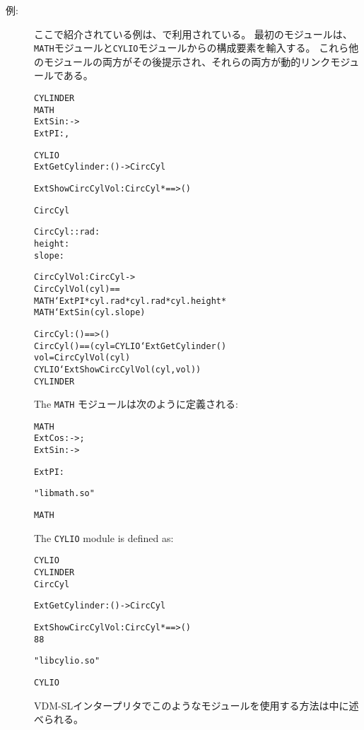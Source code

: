 \documentclass[\pformat,12pt]{jarticle}
\begin{document}
\begin{description}
\item[例:] ここで紹介されている例は、\cite{DLMan-SCSK}で利用されている。
最初のモジュールは、{\tt MATH}モジュールと{\tt CYLIO}モジュールからの構成要素を輸入する。 
これら他のモジュールの両方がその後提示され、それらの両方が動的リンクモジュールである。
\begin{alltt}
 CYLINDER
     MATH
          ExtSin :  -> 
          ExtPI : ,

     CYLIO
          ExtGetCylinder : () -> CircCyl
   
          ExtShowCircCylVol : CircCyl *  ==> ()

         CircCyl  

        CircCyl :: rad    : 
                   height : 
                   slope  : 
	
        CircCylVol : CircCyl -> 
        CircCylVol(cyl) ==
          MATH`ExtPI * cyl.rad * cyl.rad * cyl.height * 
          MATH`ExtSin(cyl.slope)

        CircCyl : () ==> ()
        CircCyl() == (  cyl = CYLIO`ExtGetCylinder()  
                          vol = CircCylVol(cyl) 
                            CYLIO`ExtShowCircCylVol(cyl, vol))
 CYLINDER
\end{alltt}

The {\tt MATH} モジュールは次のように定義される:

\begin{alltt}
 MATH
      ExtCos :  -> ;
      ExtSin :  ->   
      
      ExtPI : 
  
      "libmath.so" 

 MATH
\end{alltt}

The {\tt CYLIO} module is defined as:

\begin{alltt}
 CYLIO
     CYLINDER
        CircCyl

       ExtGetCylinder : () -> CircCyl
   
       ExtShowCircCylVol : CircCyl *  ==> ()
  88 

      "libcylio.so"

 CYLIO
\end{alltt}

VDM-SLインタープリタでこのようなモジュールを使用する方法は\cite{DLMan-SCSK}中に述べられる。
\end{description}
\end{document}
